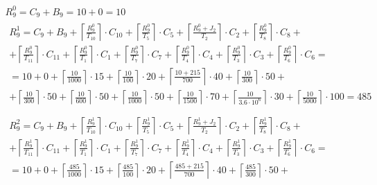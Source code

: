 \begin{gather*}
  R_9^0 = C_9 + B_9 = 10 + 0 = 10 \\
  \begin{multlined}
    R_9^1 = C_9 + B_9 + \left\lceil\frac{R_9^0}{T_{10}}\right\rceil\cdot C_{10} + %
    \left\lceil\frac{R_9^0}{T_5}\right\rceil\cdot C_5 + %
    \left\lceil\frac{R_9^0 + J_2}{T_2}\right\rceil\cdot C_2 + %
    \left\lceil\frac{R_9^0}{T_8}\right\rceil\cdot C_8 + \\%
    + \left\lceil\frac{R_9^0}{T_{11}}\right\rceil\cdot C_{11} + %
    \left\lceil\frac{R_9^0}{T_1}\right\rceil\cdot C_1 +%
    \left\lceil\frac{R_9^0}{T_7}\right\rceil\cdot C_7 +%
    \left\lceil\frac{R_9^0}{T_4}\right\rceil\cdot C_4 +%
    \left\lceil\frac{R_9^0}{T_3}\right\rceil\cdot C_3 +%
    \left\lceil\frac{R_9^0}{T_6}\right\rceil\cdot C_6 = \\%
    = 10 + 0 + \left\lceil\frac{10}{1000}\right\rceil\cdot 15 + %
    \left\lceil\frac{10}{100}\right\rceil\cdot 20 + %
    \left\lceil\frac{10 + 215}{700}\right\rceil\cdot 40 + %
    \left\lceil\frac{10}{300}\right\rceil\cdot 50 + \\%
    + \left\lceil\frac{10}{300}\right\rceil\cdot 50 + %
    \left\lceil\frac{10}{600}\right\rceil\cdot 50 + %
    \left\lceil\frac{10}{1000}\right\rceil\cdot 50 +%
    \left\lceil\frac{10}{1500}\right\rceil\cdot 70 +%
    \left\lceil\frac{10}{3.6 \cdot 10^6}\right\rceil\cdot 30 +%
    \left\lceil\frac{10}{5000}\right\rceil\cdot 100 = 485 \\
  \end{multlined} \\
  \begin{multlined}
    R_9^2 = C_9 + B_9 + \left\lceil\frac{R_9^1}{T_{10}}\right\rceil\cdot C_{10} + %
    \left\lceil\frac{R_9^1}{T_5}\right\rceil\cdot C_5 + %
    \left\lceil\frac{R_9^1 + J_2}{T_2}\right\rceil\cdot C_2 + %
    \left\lceil\frac{R_9^1}{T_8}\right\rceil\cdot C_8 + \\%
    + \left\lceil\frac{R_9^1}{T_{11}}\right\rceil\cdot C_{11} + %
    \left\lceil\frac{R_9^1}{T_1}\right\rceil\cdot C_1 +%
    \left\lceil\frac{R_9^1}{T_7}\right\rceil\cdot C_7 +%
    \left\lceil\frac{R_9^1}{T_4}\right\rceil\cdot C_4 +%
    \left\lceil\frac{R_9^1}{T_3}\right\rceil\cdot C_3 +%
    \left\lceil\frac{R_9^1}{T_6}\right\rceil\cdot C_6 = \\%
    = 10 + 0 + \left\lceil\frac{485}{1000}\right\rceil\cdot 15 + %
    \left\lceil\frac{485}{100}\right\rceil\cdot 20 + %
    \left\lceil\frac{485 + 215}{700}\right\rceil\cdot 40 + %
    \left\lceil\frac{485}{300}\right\rceil\cdot 50 + \\%

\end{multlined}
\end{gather*}
